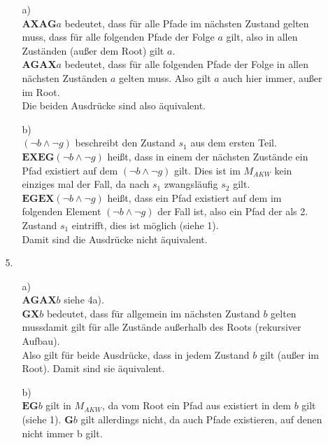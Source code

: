 \documentclass[a4paper,11pt,fleqn]{scrartcl}
\begin{document}
\begin{enumerate}
\begin{enumerate}
\begin{enumerate}
				\item[a)]\quad \\
					\(\textbf{AXAG}a\) bedeutet, dass für alle Pfade im nächsten Zustand gelten muss, dass
					für alle folgenden Pfade der Folge $a$ gilt, also in allen Zuständen (außer dem Root)
					gilt $a$. \\
					\(\textbf{AGAX}a\) bedeutet, dass für alle folgenden Pfade der Folge in allen nächsten
					Zuständen $a$ gelten muss. Also gilt $a$ auch hier immer, außer im Root. \\
					Die beiden Ausdrücke sind also äquivalent.
				\item[b)]\quad \\
					\((\lnot b\land \lnot g)\) beschreibt den Zustand $s_1$ aus dem ersten Teil.
					$\textbf{EXEG}(\lnot b\land \lnot g)$ heißt, dass in einem der nächsten Zustände ein Pfad 
					existiert auf dem $(\lnot b\land \lnot g)$ gilt. Dies ist im $M_{AKW}$ kein einziges mal 
					der Fall, da nach $s_1$ zwangsläufig $s_2$ gilt. \\
					$\textbf{EGEX}(\lnot b\land \lnot g)$ heißt, dass ein Pfad existiert auf dem im folgenden
					Element $(\lnot b\land \lnot g)$ der Fall ist, also ein Pfad der als 2. Zustand $s_1$
					eintrifft, dies ist möglich (siehe 1). \\
					Damit sind die Ausdrücke nicht äquivalent.					
			\end{enumerate}
			\item[5.]
			\begin{enumerate}
				\item[a)]\quad \\
					\(\textbf{AGAX}b\) siehe 4a). \\
					\(\textbf{GX}b\) bedeutet, dass für allgemein im nächsten Zustand $b$ gelten mussdamit 
					gilt für alle Zustände außerhalb des Roots (rekursiver Aufbau). \\
					Also gilt für beide Ausdrücke, dass in jedem Zustand $b$ gilt (außer im Root).
					Damit sind sie äquivalent. 
				\item[b)]\quad \\
					$\textbf{EG}b$ gilt in $M_{AKW}$, da vom Root ein Pfad aus existiert in dem $b$ gilt 
					(siehe 1). $\textbf{G}b$ gilt allerdings nicht, da auch Pfade existieren, auf denen nicht 
					immer b gilt.
			\end{enumerate}
		\end{enumerate}
		

\end{enumerate}
\end{document}
